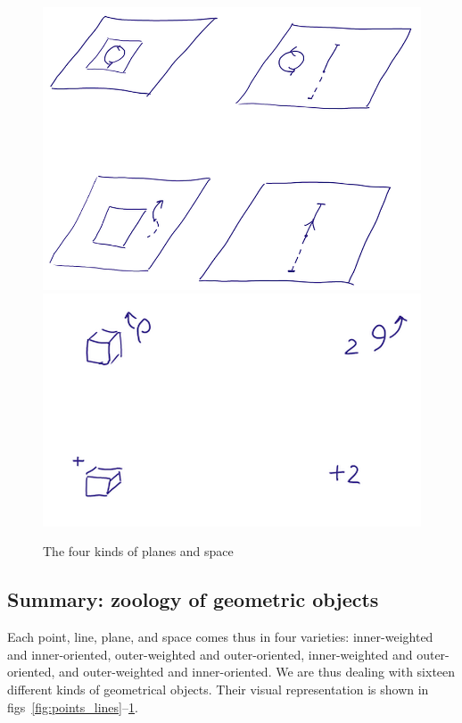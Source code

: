 \documentclass[\ifafour a4paper,12pt,\else a5paper,10pt,\fi%
onecolumn,oneside,article,%
british%
]{memoir}
\theoremstyle{remark}
\theoremstyle{innote}
\renewcommand*{\|}{\nonscript\,\vert\nonscript\;\mathopen{}}
\newcommand*{\+}{\boxplus}
\begin{document}
\begin{figure}[p!]%
 \centering\includegraphics[width=0.9\linewidth]{ex2b.png}\\[5em]\includegraphics[width=0.9\linewidth]{ex3b.png}%
\caption{The four kinds of planes and space}\label{fig:planes_space}
\end{figure}%

\subsection{Summary: zoology of geometric objects}
\label{sec:summary_kinds_objects}

Each point, line, plane, and space comes thus in four varieties:
inner-weighted and inner-oriented, outer-weighted and outer-oriented,
inner-weighted and outer-oriented, and outer-weighted and inner-oriented.
We are thus dealing with sixteen different kinds of geometrical objects.
Their visual representation is shown in
figs~\ref{fig:points_lines}--\ref{fig:planes_space}.
\end{document}
